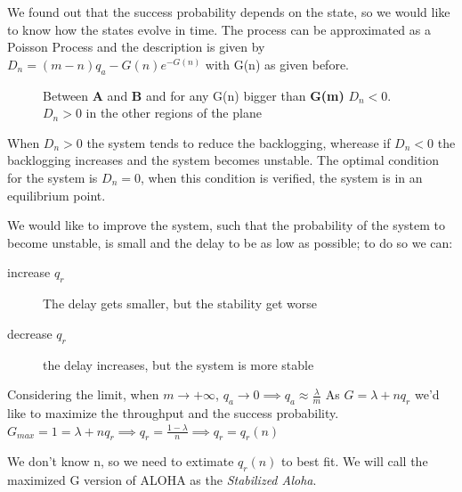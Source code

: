 We found out that the success probability depends on the state, so we would like to know how the states evolve in time.
The process can be approximated as a Poisson Process and the description is given by $D_n = (m-n) q_a - G(n) e^{-G(n)}$
with G(n) as given before.

\begin{figure}
	\centering
	
	\caption{Between \textbf{A} and \textbf{B} and for any G(n) bigger than \textbf{G(m)} $D_n <0$. $D_n>0$ in the other regions of the plane}
	\label{fig:drift}
\end{figure}

When $D_n>0$ the system tends to reduce the backlogging, wherease if $D_n<0$ the backlogging increases and the system becomes unstable. The optimal condition for the system is $D_n = 0$, when this condition is verified, the system is in an equilibrium point.

We would like to improve the system, such that the probability of the system to become
unstable, is small and the delay to be as low as possible; to do so we can:
\begin{description}
	\item[increase $q_r$] The delay gets smaller, but the stability get worse
	\item[decrease $q_r$] the delay increases, but the system is more stable
\end{description}

Considering the limit, when $m \to +\infty$, $q_a \to 0 \implies q_a \approx \frac{\lambda}{m}$
As $G=\lambda + n q_r$ we'd like to maximize the throughput and the success probability.
$G_{max}=1 = \lambda + n  q_r \implies q_r = \frac{1-\lambda}{n} \implies q_r = q_r(n)$

We don't know n, so we need to extimate $q_r(n)$ to best fit. We will call the maximized G version
of ALOHA as the \emph{Stabilized Aloha}.

